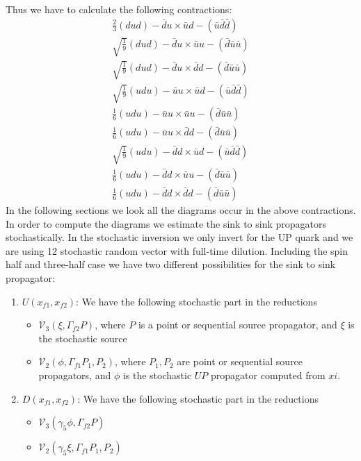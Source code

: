 \documentclass{article}[12pt]
\begin{document}
Thus we have to calculate the following contractions:
\begin{eqnarray}
       \frac{2}{3}(dud)-\bar{d}u \times \bar{u}d-(\bar{u}\bar{d}\bar{d}) \\
\sqrt{\frac{1}{9}}(dud)-\bar{d}u \times \bar{u}u-(\bar{d}\bar{u}\bar{u}) \\
\sqrt{\frac{1}{9}}(dud)-\bar{d}u \times \bar{d}d-(\bar{d}\bar{u}\bar{u}) \\
\sqrt{\frac{1}{9}}(udu)-\bar{u}u \times \bar{u}d-(\bar{u}\bar{d}\bar{d}) \\
       \frac{1}{6}(udu)-\bar{u}u \times \bar{u}u-(\bar{d}\bar{u}\bar{u}) \\
       \frac{1}{6}(udu)-\bar{u}u \times \bar{d}d-(\bar{d}\bar{u}\bar{u}) \\
\sqrt{\frac{1}{9}}(udu)-\bar{d}d \times \bar{u}d-(\bar{u}\bar{d}\bar{d}) \\
       \frac{1}{6}(udu)-\bar{d}d \times \bar{u}u-(\bar{d}\bar{u}\bar{u}) \\
       \frac{1}{6}(udu)-\bar{d}d \times \bar{d}d-(\bar{d}\bar{u}\bar{u}) 
\end{eqnarray}
In the following sections we look all the diagrams occur in the above 
contractions. In order to compute the diagrams we estimate the sink to
sink propagators stochastically. In the stochastic inversion we only invert
for the UP quark and we are using 12 stochastic random vector with full-time
dilution. Including the spin half and three-half case we have two
different possibilities for the sink to sink propagator:
\begin{enumerate}
\item $U\left(x_{f1},x_{f2}\right)$: We have the following stochastic part in the reductions
\begin{itemize}
\item ${\mathcal V}_3(\xi, \Gamma_{f2}P)$, where $P$ is a point or sequential source propagator, and $\xi$ 
is the stochastic source
\item ${\mathcal V}_2(\phi, \Gamma_{f1}P_1,P_2)$, where $P_1,P_2$ are point or sequential source propagators, and $\phi$
is the stochastic $UP$ propagator computed from $xi$.
\end{itemize}
\item $D\left(x_{f1},x_{f2}\right)$: We have the following stochastic part in the reductions
\begin{itemize}
\item ${\mathcal V}_3(\gamma_5\phi, \Gamma_{f2}P)$
\item ${\mathcal V}_2(\gamma_5\xi, \Gamma_{f1}P_1,P_2)$
\end{itemize}
\end{enumerate}
\end{document}
